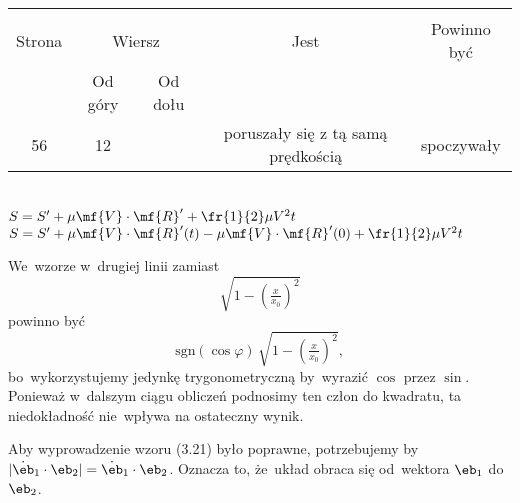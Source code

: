 \documentclass[a4paper,11pt]{article}
\begin{document}
\begin{center}
  \begin{tabular}{|c|c|c|c|c|}
    \hline
    & \multicolumn{2}{c|}{} & & \\
    Strona & \multicolumn{2}{c|}{Wiersz} & Jest
                              & Powinno być \\ \cline{2-3}
    & Od góry & Od dołu & & \\
    \hline
    56  & 12 & & poruszały się z tą samą prędkością & spoczywały \\
    \hline
  \end{tabular}
\end{center}
\noi
{} \\
\Jest $S = S' + \mu \mf{V} \cdot \mf{R}' + \fr{ 1 }{ 2 } \mu V^{ 2 } t$ \\
\Pow $S = S' + \mu \mf{V} \cdot \mf{R}'( t ) - \mu \mf{V} \cdot
\mf{R}'( 0 ) + \fr{ 1 }{ 2 } \mu V^{ 2 } t$ \\

\vspace{\spaceTwo}








\start {} We~wzorze w~drugiej linii zamiast
\begin{displaymath}
  \sqrt{1 - \left( \tfrac{ x }{ x_{ 0 } } \right)^{ 2 } }
\end{displaymath}
powinno być
\begin{displaymath}
  \mathrm{sgn}( \cos \varphi ) \, \sqrt{1 - \left( \tfrac{ x }{ x_{ 0 } }
    \right)^{ 2 } },
\end{displaymath}
bo~wykorzystujemy jedynkę trygonometryczną by~wyrazić $\cos$ przez
$\sin$. Ponieważ w~dalszym ciągu obliczeń podnosimy ten człon do
kwadratu, ta niedokładność nie~wpływa na ostateczny wynik.

\start {} Aby wyprowadzenie wzoru (3.21) było poprawne,
potrzebujemy by
$| \dot{ \eb }_{ 1 } \cdot \eb_{ 2 } | = \dot{ \eb }_{ 1 } \cdot
\eb_{ 2 }$. Oznacza to, że~układ obraca się od~wektora $\eb_{ 1 }$
do~$\eb_{ 2 }$.
\end{document}
